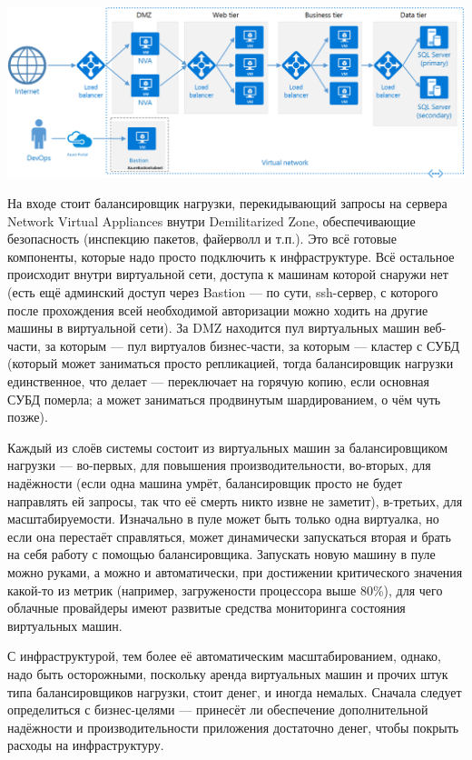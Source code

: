 \documentclass{../text-style}
\begin{document}
\begin{center}
    \includegraphics[width=\textwidth]{n-tier-physical-bastion.png}
\end{center}

На входе стоит балансировщик нагрузки, перекидывающий запросы на сервера Network Virtual Appliances внутри Demilitarized Zone, обеспечивающие безопасность (инспекцию пакетов, файерволл и т.п.). Это всё готовые компоненты, которые надо просто подключить к инфраструктуре. Всё остальное происходит внутри виртуальной сети, доступа к машинам которой снаружи нет (есть ещё админский доступ через Bastion --- по сути, ssh-сервер, с которого после прохождения всей необходимой авторизации можно ходить на другие машины в виртуальной сети). За DMZ находится пул виртуальных машин веб-части, за которым --- пул виртуалов бизнес-части, за которым --- кластер с СУБД (который может заниматься просто репликацией, тогда балансировщик нагрузки единственное, что делает --- переключает на горячую копию, если основная СУБД померла; а может заниматься продвинутым шардированием, о чём чуть позже). 

Каждый из слоёв системы состоит из виртуальных машин за балансировщиком нагрузки --- во-первых, для повышения производительности, во-вторых, для надёжности (если одна машина умрёт, балансировщик просто не будет направлять ей запросы, так что её смерть никто извне не заметит), в-третьих, для масштабируемости. Изначально в пуле может быть только одна виртуалка, но если она перестаёт справляться, может динамически запускаться вторая и брать на себя работу с помощью балансировщика. Запускать новую машину в пуле можно руками, а можно и автоматически, при достижении критического значения какой-то из метрик (например, загружености процессора выше 80\%), для чего облачные провайдеры имеют развитые средства мониторинга состояния виртуальных машин.

С инфраструктурой, тем более её автоматическим масштабированием, однако, надо быть осторожными, поскольку аренда виртуальных машин и прочих штук типа балансировщиков нагрузки, стоит денег, и иногда немалых. Сначала следует определиться с бизнес-целями --- принесёт ли обеспечение дополнительной надёжности и производительности приложения достаточно денег, чтобы покрыть расходы на инфраструктуру.
\end{document}
